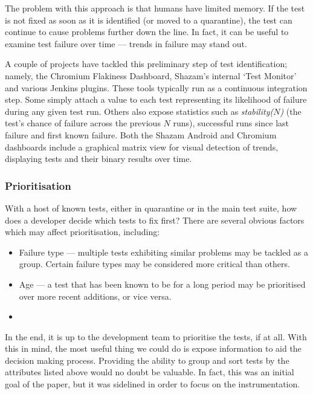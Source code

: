 The problem with this approach is that humans have limited memory. If the \flaky
test is not fixed as soon as it is identified (or moved to a quarantine), the
test can continue to cause problems further down the line. In fact, it can be
useful to examine test failure over time --- trends in failure may stand out.

A couple of projects have tackled this preliminary step of \flaky test
identification; namely, the Chromium Flakiness
Dashboard\cite{flakinessDashboard}, Shazam’s internal {\lq}\Flaky Test
Monitor{\rq} and various Jenkins plugins. These tools typically run as a
continuous integration step. Some simply attach a value to each test
representing its likelihood of failure during any given test run. Others also
expose statistics such as \emph{stability($N$)} (the test's chance of failure
across the previous $N$ runs), successful runs since last failure and first
known failure. Both the Shazam Android and Chromium dashboards include a
graphical matrix view for visual detection of trends, displaying tests and their
binary results over time.

\subsubsection{Prioritisation}

With a host of known \flaky tests, either in quarantine or in the main test
suite, how does a developer decide which tests to fix first? There are several
obvious factors which may affect prioritisation, including:
\begin{itemize}
	\item Failure type --- multiple \flaky tests exhibiting similar problems may
	be tackled as a group. Certain failure types may be considered more critical than others.
	\item Age --- a \flaky test that has been known to be \flaky for a long period
	may be prioritised over more recent additions, or vice versa.
	\item {}
\end{itemize}

In the end, it is up to the development team to prioritise the \flaky tests, if
at all. With this in mind, the most useful thing we could do is expose
information to aid the decision making process. Providing the ability to group
and sort \flaky tests by the attributes listed above would no doubt be valuable.
In fact, this was an initial goal of the paper, but it was sidelined in order to
focus on the instrumentation.

